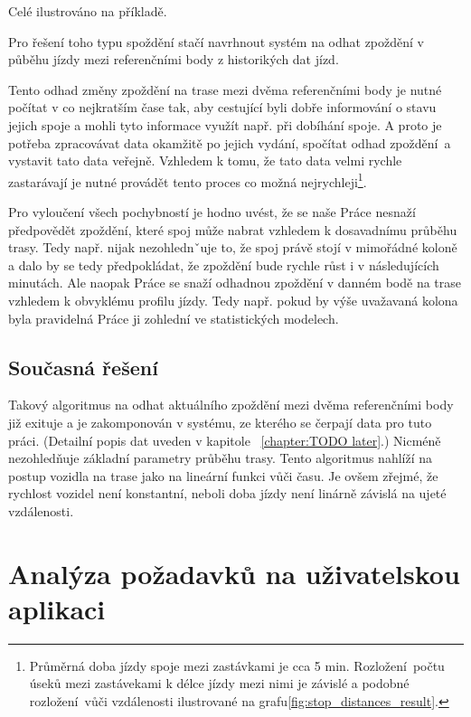 \bigbreak

Celé ilustrováno na příkladě.

\bigbreak

Pro řešení toho typu spoždění stačí navrhnout systém na odhat zpoždění v půběhu jízdy mezi referenčními body z historikých dat jízd.

\bigbreak

Tento odhad změny zpoždění na trase mezi dvěma referenčními body je nutné počítat v co nejkratším čase tak, aby cestující byli dobře informování o stavu jejich spoje a mohli tyto informace využít např. při dobíhání spoje. A proto je potřeba zpracovávat data okamžitě po jejich vydání, spočítat odhad zpoždění a vystavit tato data veřejně. Vzhledem k tomu, že tato data velmi rychle zastarávají je nutné provádět tento proces co možná nejrychleji\footnote{Průměrná doba jízdy spoje mezi zastávkami je cca 5 min. Rozložení počtu úseků mezi zastávekami k délce jízdy mezi nimi je závislé a podobné rozložení vůči vzdálenosti ilustrované na grafu\ref{fig:stop_distances_result}.}.

\bigbreak

Pro vyloučení všech pochybností je hodno uvést, že se naše Práce nesnaží předpovědět zpoždění, které spoj může nabrat vzhledem k dosavadnímu průběhu trasy. Tedy např. nijak nezohlednˇuje to, že spoj právě stojí v mimořádné koloně a dalo by se tedy předpokládat, že zpoždění bude rychle růst i v následujících minutách. Ale naopak Práce se snaží odhadnou zpoždění v danném bodě na trase vzhledem k obvyklému profilu jízdy. Tedy např. pokud by výše uvažavaná kolona byla pravidelná Práce ji zohlední ve statistických modelech.

\subsection{Současná řešení}

Takový algoritmus na odhat aktuálního zpoždění mezi dvěma referenčními body již exituje a je zakomponován v systému, ze kterého se čerpají data pro tuto práci. (Detailní popis dat uveden v kapitole ~\ref{chapter:TODO later}.) Nicméně nezohledňuje základní parametry průběhu trasy. Tento algoritmus nahlíží na postup vozidla na trase jako na lineární funkci vůči času. Je ovšem zřejmé, že rychlost vozidel není konstantní, neboli doba jízdy není linárně závislá na ujeté vzdálenosti.

\section{Analýza požadavků na uživatelskou aplikaci}

